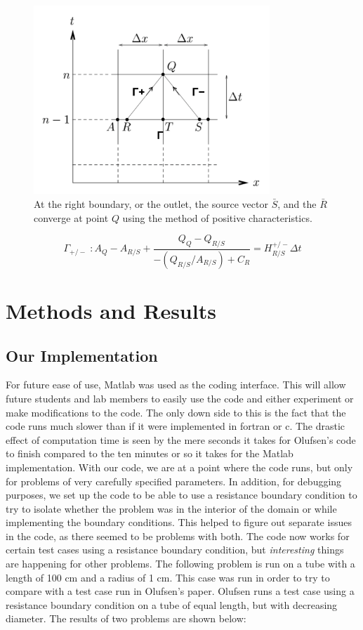 \documentclass[12pt]{article}
\newcommand{\tensor}[1]{\bar{#1}}
\begin{document}
\begin{figure}[ht]
	\centering
	\label{characteristicplot}
	\includegraphics[width=3.5in]{characterplot}
	\caption{At the right boundary, or the outlet, the source vector $\tensor{S}$, and the $\tensor{R}$ converge at point $Q$ using the method of positive characteristics.~\cite{olufsenthesis}}
\end{figure}

 \begin{equation}
 	\label{characteristics}
 	\Gamma_{+/-}\; : A_Q - A_{R/S} + \frac{Q_Q - Q_{R/S}}{-(Q_{R/S}/A_{R/S}) + C_R} = H_{R/S}^{+/-} \Delta t
\end{equation}

\section{Methods and Results}
\subsection{Our Implementation}
For future ease of use, Matlab was used as the coding interface. This will allow future students and lab members to easily use the code and either experiment or make modifications to the code. The only down side to this is the fact that the code runs much slower than if it were implemented in fortran or c. The drastic effect of computation time is seen by the mere seconds it takes for Olufsen's code to finish compared to the ten minutes or so it takes for the Matlab implementation. With our code, we are at a point where the code runs, but only for problems of very carefully specified parameters. In addition, for debugging purposes, we set up the code to be able to use a resistance boundary condition to try to isolate whether the problem was in the interior of the domain or while implementing the boundary conditions. This helped to figure out separate issues in the code, as there seemed to be problems with both. The code now works for certain test cases using a resistance boundary condition, but \textit{interesting} things are happening for other problems. The following problem is run on a tube with a length of 100 cm and a radius of 1 cm. This case was run in order to try to compare with a test case run in Olufsen's paper. Olufsen runs a test case using a resistance boundary condition on a tube of equal length, but with decreasing diameter. The results of two problems are shown below:
\end{document}
